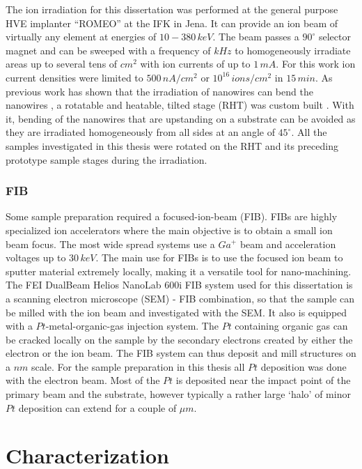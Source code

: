The ion irradiation for this dissertation was performed at the general purpose HVE implanter ``ROMEO'' at the IFK in Jena. It can provide an ion beam of virtually any element at energies of $10-380\,keV$. The beam passes a $90^\circ$ selector magnet and can be sweeped with a frequency of $kHz$ to homogeneously irradiate areas up to several tens of $cm^2$ with ion currents of up to $1\,mA$. For this work ion current densities were limited to $500\,nA/cm^2$ or $10^{16}\,ions/cm^2$ in $15\,min$. As previous work has shown that the irradiation of nanowires can bend the nanowires \cite{borschel_permanent_2011, borschel_ion-solid_2012}, a rotatable and heatable, tilted stage (RHT) was custom built \cite{noack_sputter_2014}. With it, bending of the nanowires that are upstanding on a substrate can be avoided as they are irradiated homogeneously from all sides at an angle of $45^\circ$. All the samples investigated in this thesis were rotated on the RHT and its preceding prototype sample stages during the irradiation. 

\subsubsection{FIB}

Some sample preparation required a focused-ion-beam (FIB). FIBs are highly specialized ion accelerators where the main objective is to obtain a small ion beam focus. The most wide spread systems use a $Ga^+$ beam and acceleration voltages up to $30\,keV$. The main use for FIBs is to use the focused ion beam to sputter material extremely locally, making it a versatile tool for nano-machining. The FEI DualBeam Helios NanoLab 600i FIB system used for this dissertation is a scanning electron microscope (SEM) - FIB combination, so that the sample can be milled with the ion beam and investigated with the SEM. It also is equipped with a $Pt$-metal-organic-gas injection system. The $Pt$ containing organic gas can be cracked locally on the sample by the secondary electrons created by either the electron or the ion beam. The FIB system can thus deposit and mill structures on a $nm$ scale. For the sample preparation in this thesis all $Pt$ deposition was done with the electron beam. Most of the $Pt$ is deposited near the impact point of the primary beam and the substrate, however typically a rather large `halo' of minor $Pt$ deposition can extend for a couple of $\mu m$. 

\section{Characterization}

